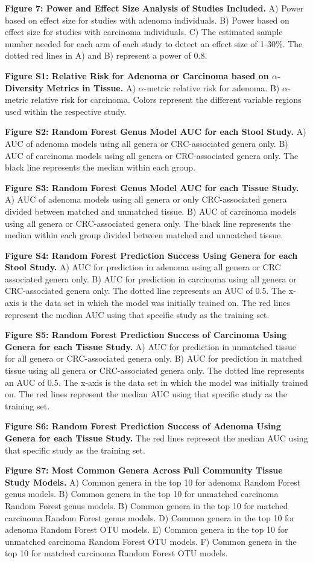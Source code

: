 \documentclass[12pt,]{article}
\begin{document}
\textbf{Figure 7: Power and Effect Size Analysis of Studies Included.}
A) Power based on effect size for studies with adenoma individuals. B)
Power based on effect size for studies with carcinoma individuals. C)
The estimated sample number needed for each arm of each study to detect
an effect size of 1-30\%. The dotted red lines in A) and B) represent a
power of 0.8.

\newpage

\textbf{Figure S1: Relative Risk for Adenoma or Carcinoma based on
\(\alpha\)-Diversity Metrics in Tissue.} A) \(\alpha\)-metric relative
risk for adenoma. B) \(\alpha\)-metric relative risk for carcinoma.
Colors represent the different variable regions used within the
respective study.

\textbf{Figure S2: Random Forest Genus Model AUC for each Stool Study.}
A) AUC of adenoma models using all genera or CRC-associated genera only.
B) AUC of carcinoma models using all genera or CRC-associated genera
only. The black line represents the median within each group.

\textbf{Figure S3: Random Forest Genus Model AUC for each Tissue Study.}
A) AUC of adenoma models using all genera or only CRC-associated genera
divided between matched and unmatched tissue. B) AUC of carcinoma models
using all genera or CRC-associated genera only. The black line
represents the median within each group divided between matched and
unmatched tissue.

\textbf{Figure S4: Random Forest Prediction Success Using Genera for
each Stool Study.} A) AUC for prediction in adenoma using all genera or
CRC associated genera only. B) AUC for prediction in carcinoma using all
genera or CRC-associated genera only. The dotted line represents an AUC
of 0.5. The x-axis is the data set in which the model was initially
trained on. The red lines represent the median AUC using that specific
study as the training set.

\textbf{Figure S5: Random Forest Prediction Success of Carcinoma Using
Genera for each Tissue Study.} A) AUC for prediction in unmatched tissue
for all genera or CRC-associated genera only. B) AUC for prediction in
matched tissue using all genera or CRC-associated genera only. The
dotted line represents an AUC of 0.5. The x-axis is the data set in
which the model was initially trained on. The red lines represent the
median AUC using that specific study as the training set.

\textbf{Figure S6: Random Forest Prediction Success of Adenoma Using
Genera for each Tissue Study.} The red lines represent the median AUC
using that specific study as the training set.

\textbf{Figure S7: Most Common Genera Across Full Community Tissue Study
Models.} A) Common genera in the top 10 for adenoma Random Forest genus
models. B) Common genera in the top 10 for unmatched carcinoma Random
Forest genus models. B) Common genera in the top 10 for matched
carcinoma Random Forest genus models. D) Common genera in the top 10 for
adenoma Random Forest OTU models. E) Common genera in the top 10 for
unmatched carcinoma Random Forest OTU models. F) Common genera in the
top 10 for matched carcinoma Random Forest OTU models.

\newpage
\end{document}
